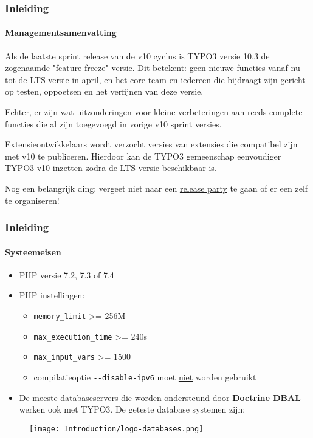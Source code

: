 \begin{frame}[fragile]
	\frametitle{Inleiding}
	\framesubtitle{Managementsamenvatting}

	\small
		Als de laatste sprint release van de v10 cyclus is TYPO3 versie 10.3 de zogenaamde
		"\href{https://typo3.org/article/land-ho-feature-freeze-ahead}{feature freeze}"
		versie. Dit betekent: geen nieuwe functies vanaf nu tot de LTS-versie in april, en
		het core team en iedereen die bijdraagt zijn gericht op testen, oppoetsen en het
		verfijnen van deze versie.

		\vspace{0.2cm}

		Echter, er zijn wat uitzonderingen voor kleine verbeteringen aan reeds complete
		functies die al zijn toegevoegd in vorige v10 sprint versies.

		\vspace{0.2cm}

		Extensieontwikkelaars wordt verzocht versies van extensies die compatibel zijn met
		v10 te publiceren. Hierdoor kan de TYPO3 gemeenschap eenvoudiger TYPO3 v10 inzetten
		zodra de LTS-versie beschikbaar is.

		\vspace{0.2cm}

		Nog een belangrijk ding: vergeet niet naar een
		\href{https://typo3.org/community/events/v10-parties}{release party} te gaan
		of er een zelf te organiseren!

	\normalsize

\end{frame}


\begin{frame}[fragile]
	\frametitle{Inleiding}
	\framesubtitle{Systeemeisen}

	\begin{itemize}
		\item PHP versie 7.2, 7.3 of 7.4
		\item PHP instellingen:

			\begin{itemize}
				\item \texttt{memory\_limit} >= 256M
				\item \texttt{max\_execution\_time} >= 240s
				\item \texttt{max\_input\_vars} >= 1500
				\item compilatieoptie \texttt{-}\texttt{-disable-ipv6} moet \underline{niet} worden gebruikt
			\end{itemize}

		\item De meeste databaseservers die worden ondersteund door \textbf{Doctrine DBAL} werken ook met TYPO3.
			De geteste database systemen zijn:
	\end{itemize}

	\begin{figure}
		\texttt{[image: Introduction/logo-databases.png]}
	\end{figure}

\end{frame}

